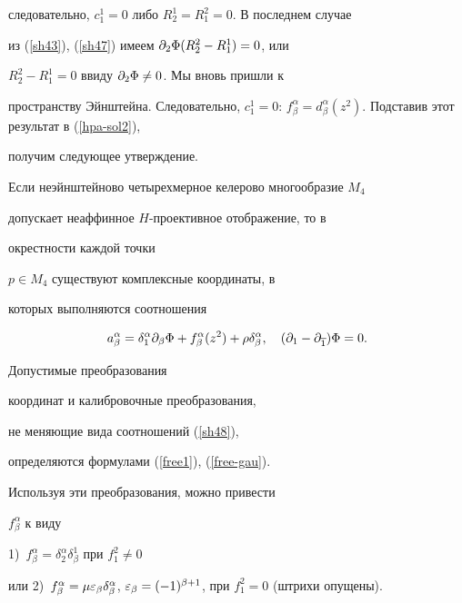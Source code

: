 следовательно, $c^1_1=0$ либо $R^1_2 = R_1^2 =0$. В последнем случае


из (\ref{sh43}), (\ref{sh47}) имеем $\partial_ 2 \Phi (R^2_2-R_1^1)=0$, или


$R^2_2-R_1^1=0$ ввиду $\partial_ 2\Phi \neq 0$. Мы вновь пришли к


пространству Эйнштейна. Следовательно, $c_1^1 = 0$: $f^\alpha_\beta =


d^\alpha_\beta(z^2)$. Подставив этот результат в (\ref{hpa-sol2}),


получим следующее утверждение.





\begin{lem}\label{sh-lm2}


Если неэйнштейново четырехмерное келерово многообразие $M_4$


допускает неаффинное $H$-проективное отображение, то в


окрестности каждой точки


$p \in M_4$ существуют комплексные координаты, в


которых выполняются соотношения


\begin{equation}


\label{sh48}


a^\alpha_\beta =\delta_1^\alpha \pl\beta\Phi


+f_\beta^\alpha(z^2) +\rho \delta_\beta^\alpha, \quad \dmin\Phi =0.


\end{equation}


\end{lem}





Допустимые преобразования


координат и калибровочные преобразования,


не меняющие вида соотношений (\ref{sh48}),


определяются формулами (\ref{free1}), (\ref{free-gau}).


Используя эти преобразования, можно привести


$f^\alpha_\beta$ к виду


1)~$f^\alpha_\beta =\delta^\alpha_2\delta_\beta^1$ при $f^2_1 \neq 0$


или 2)~$f^\alpha_\beta = \mu \ve\beta\delta^\alpha_\beta$, $\ve\beta


=(-1)^{\beta+1}$, при $f^2_1= 0$ (штрихи опущены).


